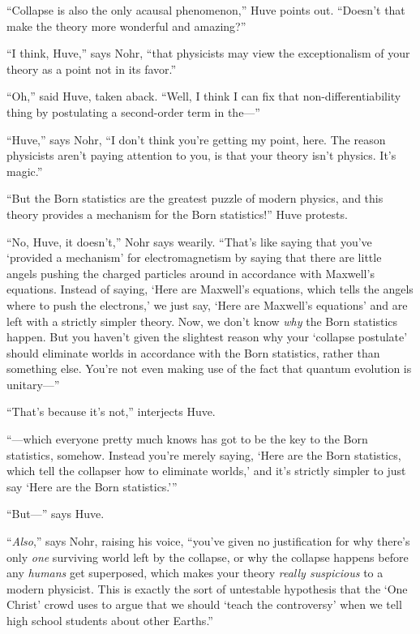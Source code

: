 {
 ``Collapse is also the only acausal
phenomenon,'' Huve points out.
``Doesn't that make the theory more
wonderful and amazing?''}

{
 ``I think, Huve,'' says Nohr,
``that physicists may view the exceptionalism of your
theory as a point not in its favor.''}

{
 ``Oh,'' said Huve, taken aback.
``Well, I think I can fix that non-differentiability
thing by postulating a second-order term in the---''}

{
 ``Huve,'' says Nohr,
``I don't think you're
getting my point, here. The reason physicists aren't
paying attention to you, is that your theory isn't
physics. It's magic.''}

{
 ``But the Born statistics are the greatest puzzle
of modern physics, and this theory provides a mechanism for the Born
statistics!'' Huve protests.}

{
 ``No, Huve, it
doesn't,'' Nohr says wearily.
``That's like saying that
you've `provided a
mechanism' for electromagnetism by saying that there
are little angels pushing the charged particles around in accordance
with Maxwell's equations. Instead of saying,
`Here are Maxwell's equations, which
tells the angels where to push the electrons,' we just
say, `Here are Maxwell's
equations' and are left with a strictly simpler theory.
Now, we don't know \textit{why} the Born statistics
happen. But you haven't given the slightest reason why
your `collapse postulate' should
eliminate worlds in accordance with the Born statistics, rather than
something else. You're not even making use of the fact
that quantum evolution is unitary---''}

{
 ``That's because
it's not,'' interjects Huve.}

{
 ``---which everyone pretty much knows has got to
be the key to the Born statistics, somehow. Instead
you're merely saying, `Here are the Born
statistics, which tell the collapser how to eliminate
worlds,' and it's strictly simpler to
just say `Here are the Born
statistics.'''}

{
 ``But---'' says Huve.}

{
 ``\textit{Also},'' says Nohr,
raising his voice, ``you've given no
justification for why there's only \textit{one}
surviving world left by the collapse, or why the collapse happens
before any \textit{humans} get superposed, which makes your theory
\textit{really suspicious} to a modern physicist. This is exactly the
sort of untestable hypothesis that the `One
Christ' crowd uses to argue that we should
`teach the controversy' when we tell
high school students about other Earths.''}

